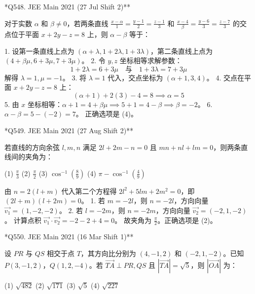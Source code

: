 \begin{questions}
\question **Q548. JEE Main 2021 (27 Jul Shift 2)**

对于实数 $\alpha$ 和 $\beta \neq 0$，若两条直线 $\frac{x-\alpha}{1} = \frac{y-1}{2} = \frac{z-1}{3}$ 和 $\frac{x-4}{\beta} = \frac{y-6}{3} = \frac{z-7}{3}$ 的交点位于平面 $x + 2y - z = 8$ 上，则 $\alpha - \beta$ 等于：

\begin{solution}
1. 设第一条直线上点为 $(\alpha + \lambda, 1 + 2\lambda, 1 + 3\lambda)$，第二条直线上点为 $(4 + \beta\mu, 6 + 3\mu, 7 + 3\mu)$。
2. 令 $y, z$ 坐标相等求解参数：
\[ 1 + 2\lambda = 6 + 3\mu \quad \text{与} \quad 1 + 3\lambda = 7 + 3\mu \]
解得 $\lambda = 1, \mu = -1$。
3. 将 $\lambda = 1$ 代入，交点坐标为 $(\alpha + 1, 3, 4)$。
4. 交点在平面 $x + 2y - z = 8$ 上：
\[ (\alpha + 1) + 2(3) - 4 = 8 \implies \alpha = 5 \]
5. 由 $x$ 坐标相等：$\alpha + 1 = 4 + \beta\mu \implies 5 + 1 = 4 - \beta \implies \beta = -2$。
6. $\alpha - \beta = 5 - (-2) = 7$。
正确选项是 (4)。
\end{solution}

\question **Q549. JEE Main 2021 (27 Aug Shift 2)**

若直线的方向余弦 $l, m, n$ 满足 $2l + 2m - n = 0$ 且 $mn + nl + lm = 0$，则两条直线间的夹角为：

(1) $\frac{\pi}{3}$ \quad (2) $\frac{\pi}{2}$ \quad (3) $\cos^{-1}(\frac{8}{9})$ \quad (4) $\pi - \cos^{-1}(\frac{4}{9})$

\begin{solution}
由 $n = 2(l+m)$ 代入第二个方程得 $2l^2 + 5lm + 2m^2 = 0$，即 $(2l+m)(l+2m)=0$。
1. 若 $m=-2l$，则 $n=-2l$，方向向量 $\vec{v_1} = (1, -2, -2)$。
2. 若 $l=-2m$，则 $n=-2m$，方向向量 $\vec{v_2} = (-2, 1, -2)$。
计算点积 $\vec{v_1} \cdot \vec{v_2} = -2 - 2 + 4 = 0$。
故夹角为 $\frac{\pi}{2}$。正确选项是 (2)。
\end{solution}

\question **Q550. JEE Main 2021 (16 Mar Shift 1)**

设 $PR$ 与 $QS$ 相交于点 $T$，其方向比分别为 $(4, -1, 2)$ 和 $(-2, 1, -2)$。已知 $P(3, -1, 2)$，$Q(1, 2, -4)$。若 $\vec{TA} \perp PR, QS$ 且 $|\vec{TA}| = \sqrt{5}$，则 $|\vec{OA}|$ 为：

(1) $\sqrt{482}$ \quad (2) $\sqrt{171}$ \quad (3) $\sqrt{5}$ \quad (4) $\sqrt{227}$


\end{questions}
